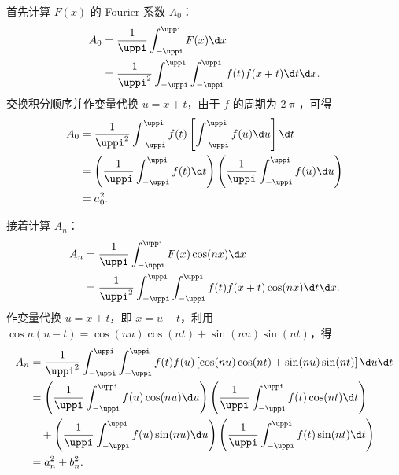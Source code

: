 \begin{myproof}
    首先计算 $F(x)$ 的 Fourier 系数 $A_0$：
    \begin{equation}\label{eq:A0-calc-7}
        \begin{aligned}
            A_0 & = \frac{1}{\uppi} \int_{-\uppi}^{\uppi} F(x) \d x                                      \\
                & = \frac{1}{\uppi^2} \int_{-\uppi}^{\uppi} \int_{-\uppi}^{\uppi} f(t) f(x+t) \d t \d x.
        \end{aligned}
    \end{equation}
    交换积分顺序并作变量代换 $u = x+t$，由于 $f$ 的周期为 $2\uppi$，可得
    \begin{equation}
        \begin{aligned}
            A_0 & = \frac{1}{\uppi^2} \int_{-\uppi}^{\uppi} f(t) \left[ \int_{-\uppi}^{\uppi} f(u) \d u \right] \d t                              \\
                & = \left( \frac{1}{\uppi} \int_{-\uppi}^{\uppi} f(t) \d t \right) \left( \frac{1}{\uppi} \int_{-\uppi}^{\uppi} f(u) \d u \right) \\
                & = a_0^2.
        \end{aligned}
    \end{equation}

    接着计算 $A_n$：
    \begin{equation}\label{eq:An-calc-7}
        \begin{aligned}
            A_n & = \frac{1}{\uppi} \int_{-\uppi}^{\uppi} F(x) \cos(nx) \d x                                      \\
                & = \frac{1}{\uppi^2} \int_{-\uppi}^{\uppi} \int_{-\uppi}^{\uppi} f(t) f(x+t) \cos(nx) \d t \d x.
        \end{aligned}
    \end{equation}
    作变量代换 $u = x+t$，即 $x = u-t$，利用 $\cos n(u-t) = \cos(nu) \cos(nt) + \sin(nu) \sin(nt)$，得
    \begin{equation}
        \begin{aligned}
            A_n & = \frac{1}{\uppi^2} \int_{-\uppi}^{\uppi} \int_{-\uppi}^{\uppi} f(t) f(u) \left[ \cos(nu) \cos(nt) + \sin(nu) \sin(nt) \right] \d u \d t                \\
                & = \left( \frac{1}{\uppi} \int_{-\uppi}^{\uppi} f(u) \cos(nu) \d u \right) \left( \frac{1}{\uppi} \int_{-\uppi}^{\uppi} f(t) \cos(nt) \d t \right)       \\
                & \quad + \left( \frac{1}{\uppi} \int_{-\uppi}^{\uppi} f(u) \sin(nu) \d u \right) \left( \frac{1}{\uppi} \int_{-\uppi}^{\uppi} f(t) \sin(nt) \d t \right) \\
                & = a_n^2 + b_n^2.
        \end{aligned}
    \end{equation}


\end{myproof}
